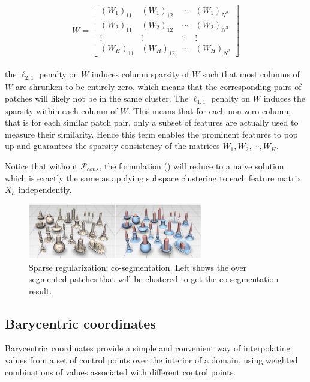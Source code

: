 \small{
\begin{equation}
 \label{eq:edgecotanoperator}
 W = {\left[ \begin{array}{cccc}
 (W_1)_{11} & (W_1)_{12} & \cdots & (W_1)_{N^2}\\
 (W_2)_{11} & (W_2)_{12} & \cdots & (W_2)_{N^2}\\
 \vdots & \vdots & \ddots & \vdots\\
 (W_{H})_{11} & (W_{H})_{12} & \cdots & (W_{H})_{N^2}
 \end{array}
 \right]}
\end{equation}
}
\\
the $\ell_{2,1}$ penalty on $W$ induces column sparsity of $W$ such that most columns of $W$ are shrunken to be entirely zero, which means that the corresponding pairs of patches will likely not be in the same cluster.
The $\ell_{1,1}$ penalty on $W$ induces the sparsity within each column of $W$.
This means that for each non-zero column, that is for each similar patch pair, only a subset of features are actually used to measure their similarity.
Hence this term enables the prominent features to pop up and guarantees the sparsity-consistency of the matrices $W_1,W_2,\cdots,W_H$.

Notice that without $\mathcal{P}_{cons}$, the formulation () will reduce to a naive solution which is exactly the same as applying subspace clustering to each feature matrix $X_{h}$ independently.

\begin{figure}[ht]
  \centering
  \includegraphics[width=3in]{images/co-segmentation}
  \caption{Sparse regularization: co-segmentation\cite{hu2012co}. Left shows the over segmented patches that will be clustered to get the co-segmentation result.}
\end{figure}


\subsection{Barycentric coordinates}

Barycentric~coordinates provide a simple and convenient way of interpolating values from a set of control points over the interior of a domain, using weighted combinations of values associated with different control points.

